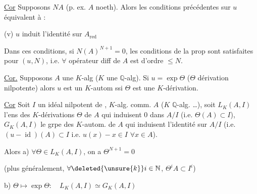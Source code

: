 \uline{Cor}  Supposons $NA$  (p. ex. $A$ noeth). Alors les conditions précédentes sur $u$ équivalent à :

(v) $u$ induit l'identité sur $A_{\mathrm{red}}$

Dans ces conditions, \deleted{\unsure{\exists}} si  $N(A)^{N+1}=0$, les conditions de la prop sont satisfaites pour $(u,N)$, i.e. $\forall$ opérateur diff de $A$ est d'ordre $\leq N$.

\uline{Cor.} Supposons $A$ une $K$-alg ($K$ une $\mathbb{Q}$-alg). Si $u=\exp\Theta$ ($\Theta$ dérivation nilpotente) alors $u$ est un $K$-autom ssi $\Theta$ est une $K$-dérivation.

\uline{Cor} Soit $I$ un idéal nilpotent de , $K$-alg. comm. $A$ ($K$ $\mathbb{Q}$-alg. \ldots),  soit $L_K(A,I)$ l'ens des $K$-dérivations $\Theta$  de $A$ qui induisent $0$ dans $A/I$ (i.e. $\Theta(A)\subset I$), $G_K(A,I)$ le grpe des $K$-autom. de $A$  qui induisent l'identité sur  $A/I$ (i.e. $(u-\operatorname{id})(A)\subset I$ i.e. $u(x)-x\in I$ $\forall x\in A$).

Alors a) $\forall\Theta\in L_K(A,I)$, on a $\Theta^{N+1}=0$

(plus généralement, $\forall\deleted{\unsure{k}}i\in\mathbb{N}$, $\Theta^i A\subset I^i$)

b) $\Theta\longmapsto\exp\Theta:\quad L_K(A,I)\simeq G_K(A,I)$
